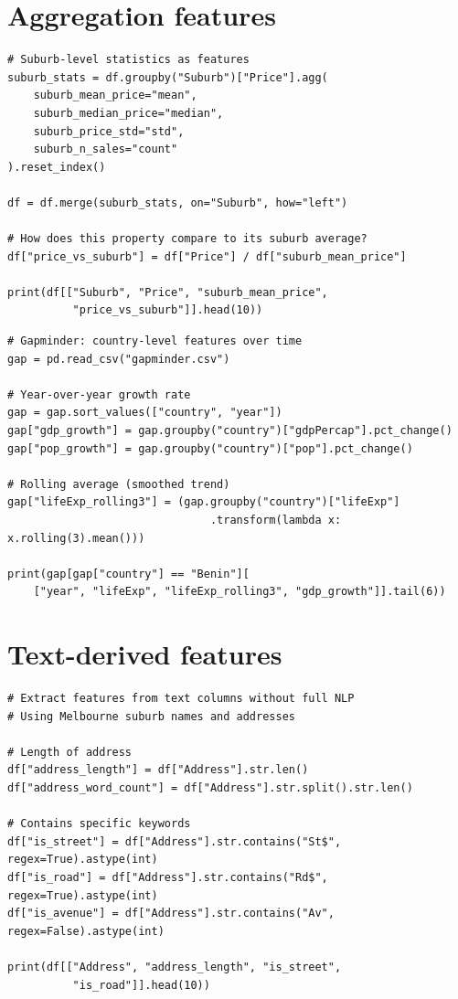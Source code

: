 \section{Aggregation features}

\begin{verbatim}
# Suburb-level statistics as features
suburb_stats = df.groupby("Suburb")["Price"].agg(
    suburb_mean_price="mean",
    suburb_median_price="median",
    suburb_price_std="std",
    suburb_n_sales="count"
).reset_index()

df = df.merge(suburb_stats, on="Suburb", how="left")

# How does this property compare to its suburb average?
df["price_vs_suburb"] = df["Price"] / df["suburb_mean_price"]

print(df[["Suburb", "Price", "suburb_mean_price",
          "price_vs_suburb"]].head(10))
\end{verbatim}

\begin{verbatim}
# Gapminder: country-level features over time
gap = pd.read_csv("gapminder.csv")

# Year-over-year growth rate
gap = gap.sort_values(["country", "year"])
gap["gdp_growth"] = gap.groupby("country")["gdpPercap"].pct_change()
gap["pop_growth"] = gap.groupby("country")["pop"].pct_change()

# Rolling average (smoothed trend)
gap["lifeExp_rolling3"] = (gap.groupby("country")["lifeExp"]
                               .transform(lambda x: x.rolling(3).mean()))

print(gap[gap["country"] == "Benin"][
    ["year", "lifeExp", "lifeExp_rolling3", "gdp_growth"]].tail(6))
\end{verbatim}

\section{Text-derived features}

\begin{verbatim}
# Extract features from text columns without full NLP
# Using Melbourne suburb names and addresses

# Length of address
df["address_length"] = df["Address"].str.len()
df["address_word_count"] = df["Address"].str.split().str.len()

# Contains specific keywords
df["is_street"] = df["Address"].str.contains("St$", regex=True).astype(int)
df["is_road"] = df["Address"].str.contains("Rd$", regex=True).astype(int)
df["is_avenue"] = df["Address"].str.contains("Av", regex=False).astype(int)

print(df[["Address", "address_length", "is_street",
          "is_road"]].head(10))
\end{verbatim}

